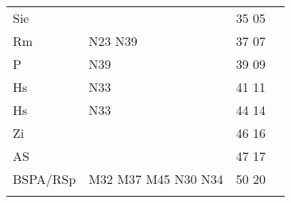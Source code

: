 \begin{tabular}{!{\color{schiefergrau}\vrule width 3pt}*{4}{l!{\color{schiefergrau}\vrule width 3pt}}}
Sie          &                                             & 35 05 &       \\
Rm           & \nbus{} N23 N39                             & 37 07 &       \\
P            & \nbus{} N39                                 & 39 09 &       \\
Hs           & \nbus{} N33                                 & 41 11 &       \\
\hline
Hs           & \nbus{} N33                                 & 44 14 &       \\
Zi           &                                             & 46 16 &       \\
AS           &                                             & 47 17 &       \\
BSPA/RSp     & \mbus{} M32 M37 M45 \nbus{} N30 N34         & 50 20 &       \\
\myhline
\end{tabular}
